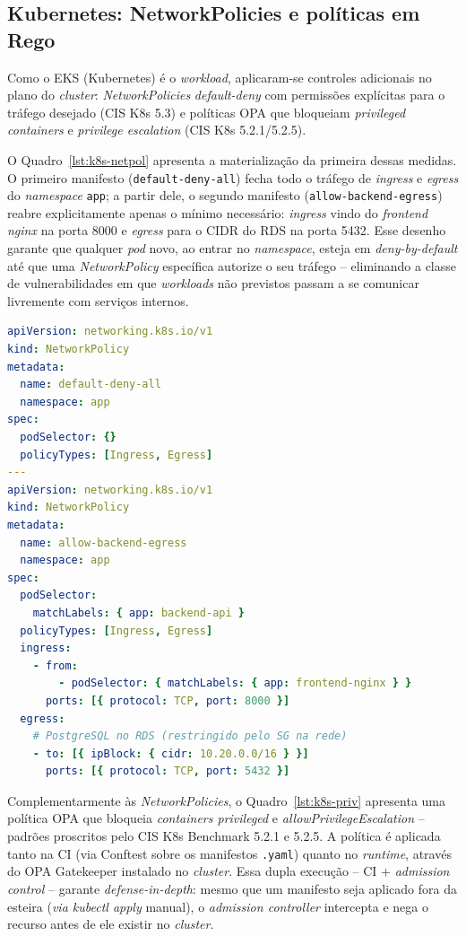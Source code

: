 \subsection{Kubernetes: NetworkPolicies e políticas em Rego}

Como o EKS (Kubernetes) é o \textit{workload}, aplicaram-se controles adicionais no plano do \textit{cluster}: \textit{NetworkPolicies} \textit{default-deny} com permissões explícitas para o tráfego desejado (CIS K8s 5.3) e políticas OPA que bloqueiam \textit{privileged containers} e \textit{privilege escalation} (CIS K8s 5.2.1/5.2.5).

O Quadro~\ref{lst:k8s-netpol} apresenta a materialização da primeira dessas medidas. O primeiro manifesto (\texttt{default-deny-all}) fecha todo o tráfego de \textit{ingress} e \textit{egress} do \textit{namespace} \texttt{app}; a partir dele, o segundo manifesto (\texttt{allow-backend-egress}) reabre explicitamente apenas o mínimo necessário: \textit{ingress} vindo do \textit{frontend nginx} na porta 8000 e \textit{egress} para o CIDR do RDS na porta 5432. Esse desenho garante que qualquer \textit{pod} novo, ao entrar no \textit{namespace}, esteja em \textit{deny-by-default} até que uma \textit{NetworkPolicy} específica autorize o seu tráfego -- eliminando a classe de vulnerabilidades em que \textit{workloads} não previstos passam a se comunicar livremente com serviços internos.

\begin{lstlisting}[language=yaml,caption={\textit{NetworkPolicy} \textit{default-deny-all} no \textit{namespace} da aplicação (\texttt{k8s/manifests/50-network-policies.yaml}).},label={lst:k8s-netpol}]
apiVersion: networking.k8s.io/v1
kind: NetworkPolicy
metadata:
  name: default-deny-all
  namespace: app
spec:
  podSelector: {}
  policyTypes: [Ingress, Egress]
---
apiVersion: networking.k8s.io/v1
kind: NetworkPolicy
metadata:
  name: allow-backend-egress
  namespace: app
spec:
  podSelector:
    matchLabels: { app: backend-api }
  policyTypes: [Ingress, Egress]
  ingress:
    - from:
        - podSelector: { matchLabels: { app: frontend-nginx } }
      ports: [{ protocol: TCP, port: 8000 }]
  egress:
    # PostgreSQL no RDS (restringido pelo SG na rede)
    - to: [{ ipBlock: { cidr: 10.20.0.0/16 } }]
      ports: [{ protocol: TCP, port: 5432 }]
\end{lstlisting}

Complementarmente às \textit{NetworkPolicies}, o Quadro~\ref{lst:k8s-priv} apresenta uma política OPA que bloqueia \textit{containers privileged} e \textit{allowPrivilegeEscalation} -- padrões proscritos pelo CIS K8s Benchmark 5.2.1 e 5.2.5. A política é aplicada tanto na CI (via Conftest sobre os manifestos \texttt{.yaml}) quanto no \textit{runtime}, através do OPA Gatekeeper instalado no \textit{cluster}. Essa dupla execução -- CI + \textit{admission control} -- garante \textit{defense-in-depth}: mesmo que um manifesto seja aplicado fora da esteira (\textit{via kubectl apply} manual), o \textit{admission controller} intercepta e nega o recurso antes de ele existir no \textit{cluster}.

